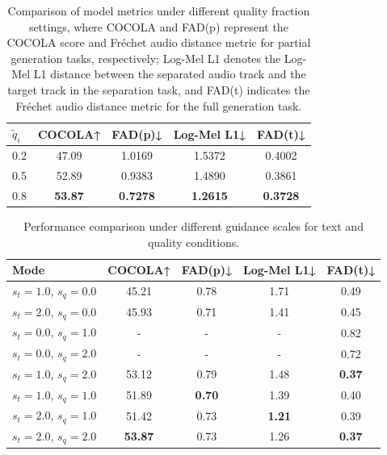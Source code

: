\documentclass[lettersize,journal]{IEEEtran}
\begin{document}
\begin{table}[t!]
    \centering
    \caption{Comparison of model metrics under different quality fraction settings, where COCOLA and FAD(p) represent the COCOLA score and Fréchet audio distance metric for partial generation tasks, respectively; Log-Mel L1 denotes the Log-Mel L1 distance between the separated audio track and the target track in the separation task, and FAD(t) indicates the Fréchet audio distance metric for the full generation task.}
    \begin{tabular}{lcccc}
        \toprule
        $\tilde{q}_i$  & COCOLA↑ & FAD(p)↓ & Log-Mel L1↓ & FAD(t)↓ \\
        \midrule
        0.2     & 47.09   & 1.0169 & 1.5372 & 0.4002 \\
        0.5     & 52.89   & 0.9383 & 1.4890 & 0.3861 \\
        0.8     & \textbf{53.87}  & \textbf{0.7278} & \textbf{1.2615} & \textbf{0.3728} \\
        \bottomrule
    \end{tabular}
    \label{tab:q}
\end{table}
\begin{table}[t!]
    \centering
    \caption{Performance comparison under different guidance scales for text and quality conditions.}
    \begin{tabular}{lcccc}
        \toprule
        Mode & COCOLA↑ & FAD(p)↓ & Log-Mel L1↓ & FAD(t)↓ \\
        \midrule
        $s_t = 1.0$, $s_q = 0.0$     & 45.21   & 0.78 & 1.71 & 0.49 \\
        $s_t = 2.0$, $s_q = 0.0$     & 45.93   & 0.71 & 1.41 & 0.45 \\
        $s_t = 0.0$, $s_q = 1.0$     & -   & - & - & 0.82 \\
        $s_t = 0.0$, $s_q = 2.0$     & -   & - & - & 0.72 \\
        $s_t = 1.0$, $s_q = 2.0$     & 53.12   & 0.79 & 1.48 & \textbf{0.37} \\
        $s_t = 1.0$, $s_q = 1.0$     & 51.89   & \textbf{0.70} & 1.39 & 0.40 \\
        $s_t = 2.0$, $s_q = 1.0$     & 51.42   & 0.73 & \textbf{1.21} & 0.39 \\
        $s_t = 2.0$, $s_q = 2.0$     & \textbf{53.87}  & 0.73 & 1.26 & \textbf{0.37} \\
        \bottomrule
    \end{tabular}
    \label{tab:mode_ablation}
\end{table}
\end{document}
